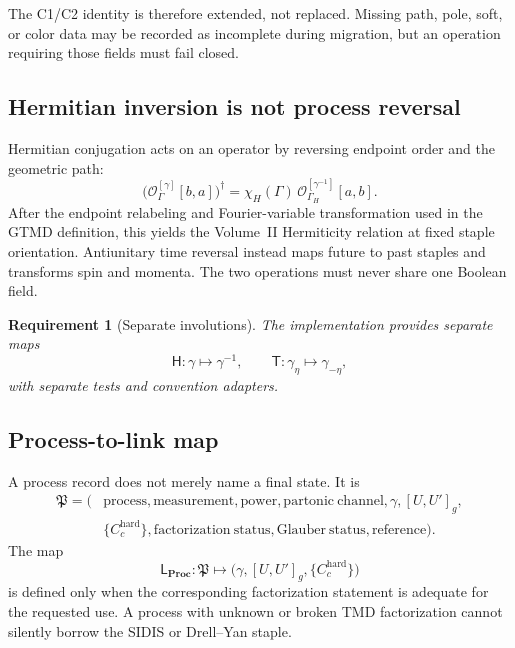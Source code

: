 \documentclass[11pt]{article}
\newtheorem{requirement}[definition]{Requirement}
\newcommand{\Proc}{\mathbf{Proc}}
\newcommand{\cO}{\mathcal O}
\newcommand{\hard}{\mathrm{hard}}
\begin{document}
The C1/C2 identity is therefore extended, not replaced.  Missing path, pole,
soft, or color data may be recorded as incomplete during migration, but an
operation requiring those fields must fail closed.

\subsection{Hermitian inversion is not process reversal}

Hermitian conjugation acts on an operator by reversing endpoint order and the
geometric path:
\begin{equation}
 \bigl(\cO_{\Gamma}^{[\gamma]}[b,a]\bigr)^\dagger
 =\chi_H(\Gamma)\,
 \cO_{\Gamma_H}^{[\gamma^{-1}]}[a,b].
\label{eq:operator-hermitian-conjugation}
\end{equation}
After the endpoint relabeling and Fourier-variable transformation used in the
GTMD definition, this yields the Volume~II Hermiticity relation at fixed
staple orientation.  Antiunitary time reversal instead maps future to past
staples and transforms spin and momenta.  The two operations must never share
one Boolean field.

\begin{requirement}[Separate involutions]
\label{req:separate-involutions}
The implementation provides separate maps
\begin{equation}
 \mathsf H:\gamma\mapsto\gamma^{-1},
 \qquad
 \mathsf T:\gamma_\eta\mapsto\gamma_{-\eta},
\label{eq:separate-involution-maps}
\end{equation}
with separate tests and convention adapters.
\end{requirement}

\subsection{Process-to-link map}

A process record does not merely name a final state.  It is
\begin{equation}
\begin{aligned}
 \mathfrak P=\bigl(&
 \mathrm{process},\mathrm{measurement},\mathrm{power},
 \mathrm{partonic\ channel},\gamma,[U,U']_g,\\
 &\{C_c^{\hard}\},\mathrm{factorization\ status},
 \mathrm{Glauber\ status},\mathrm{reference}\bigr).
\end{aligned}
\label{eq:process-record}
\end{equation}
The map
\begin{equation}
 \mathsf L_{\Proc}:\mathfrak P\longmapsto
 \bigl(\gamma,[U,U']_g,\{C_c^{\hard}\}\bigr)
\label{eq:process-link-map}
\end{equation}
is defined only when the corresponding factorization statement is adequate
for the requested use.  A process with unknown or broken TMD factorization
cannot silently borrow the SIDIS or Drell--Yan staple.
\end{document}
